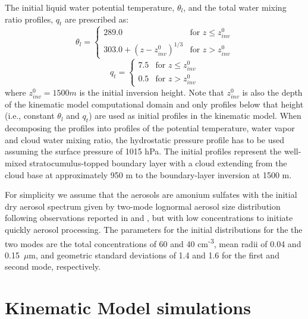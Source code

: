 \documentclass{article}
\begin{document}
  The initial liquid water potential temperature, $\theta_l$, and the total water 
    mixing ratio profiles, $q_t$ are prescribed as:
    \begin{equation*}
      \theta_l = \begin{cases}
        289.0 & \mbox{for~} z \le z^0_{inv}\\
        303.0 + (z - z^0_{inv})^{1/3} & \mbox{for~} z > z^0_{inv}
      \end{cases}
    \end{equation*}
    \begin{equation*}
      q_t = \begin{cases}
        7.5 & \mbox{for~} z \le z^0_{inv}\\
        0.5 & \mbox{for~} z > z^0_{inv}
      \end{cases}
    \end{equation*}
    where $z^0_{inv} = 1500 m$ is the initial inversion height. 
  Note that $z^0_{inv}$ is also the depth of the kinematic model computational domain 
    and only profiles below that height (i.e., constant $\theta_l$ and $q_t$) are used 
    as initial profiles in the kinematic model. 
  When decomposing the profiles into profiles of the potential temperature, water vapor 
    and cloud water mixing ratio, the hydrostatic pressure profile has to be used assuming 
    the surface pressure of 1015 hPa. 
  The initial profiles represent the well-mixed stratocumulus-topped boundary layer with 
    a cloud extending from the cloud base at approximately 950 m to the boundary-layer 
    inversion at 1500 m.

  For simplicity we assume that the aerosols are amonium sulfates with the initial dry 
    aerosol spectrum given by two-mode lognormal aerosol size distribution following 
    observations reported in \citet[][Figs.~15 and 16 therein]{Wood_et_al_2011} and 
    \citet[][Table~4 therein]{Allen_et_al_2011}, but with low concentrations to initiate 
    quickly aerosol processing. 
  The parameters for the initial distributions for the the two modes are the total 
    concentrations of 60 and 40 cm\textsuperscript{-3}, mean radii of 0.04 and 0.15~$\mu$m, 
    and geometric standard deviations of 1.4 and 1.6 for the first and second mode, respectively.

  \section{Kinematic Model simulations}
\end{document}
